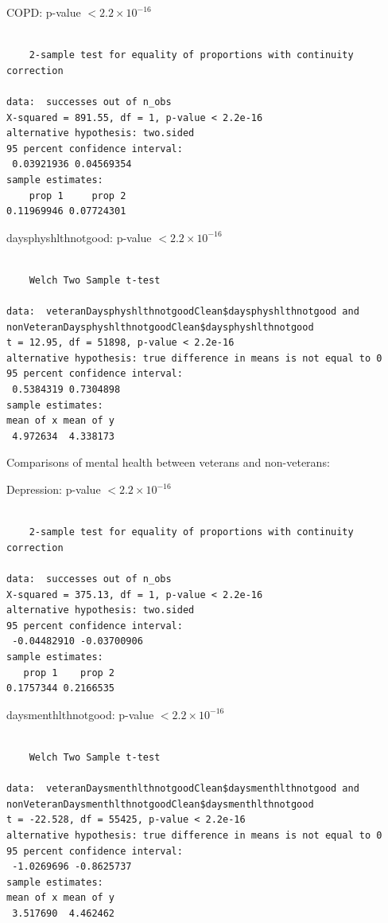 \documentclass[
  10pt,
  letterpaper,
  DIV=11,
  numbers=noendperiod]{scrartcl}
\begin{document}
COPD: p-value \(< 2.2 \times 10^{-16}\)

\begin{verbatim}

    2-sample test for equality of proportions with continuity correction

data:  successes out of n_obs
X-squared = 891.55, df = 1, p-value < 2.2e-16
alternative hypothesis: two.sided
95 percent confidence interval:
 0.03921936 0.04569354
sample estimates:
    prop 1     prop 2 
0.11969946 0.07724301 
\end{verbatim}

daysphyshlthnotgood: p-value \(< 2.2 \times 10^{-16}\)

\begin{verbatim}

    Welch Two Sample t-test

data:  veteranDaysphyshlthnotgoodClean$daysphyshlthnotgood and nonVeteranDaysphyshlthnotgoodClean$daysphyshlthnotgood
t = 12.95, df = 51898, p-value < 2.2e-16
alternative hypothesis: true difference in means is not equal to 0
95 percent confidence interval:
 0.5384319 0.7304898
sample estimates:
mean of x mean of y 
 4.972634  4.338173 
\end{verbatim}

Comparisons of mental health between veterans and non-veterans:

Depression: p-value \(< 2.2 \times 10^{-16}\)

\begin{verbatim}

    2-sample test for equality of proportions with continuity correction

data:  successes out of n_obs
X-squared = 375.13, df = 1, p-value < 2.2e-16
alternative hypothesis: two.sided
95 percent confidence interval:
 -0.04482910 -0.03700906
sample estimates:
   prop 1    prop 2 
0.1757344 0.2166535 
\end{verbatim}

daysmenthlthnotgood: p-value \(< 2.2 \times 10^{-16}\)

\begin{verbatim}

    Welch Two Sample t-test

data:  veteranDaysmenthlthnotgoodClean$daysmenthlthnotgood and nonVeteranDaysmenthlthnotgoodClean$daysmenthlthnotgood
t = -22.528, df = 55425, p-value < 2.2e-16
alternative hypothesis: true difference in means is not equal to 0
95 percent confidence interval:
 -1.0269696 -0.8625737
sample estimates:
mean of x mean of y 
 3.517690  4.462462 
\end{verbatim}
\end{document}
